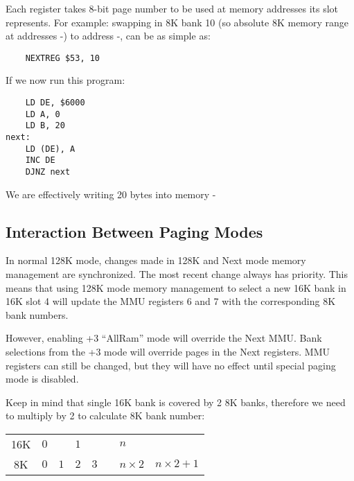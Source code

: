 \documentclass[12pt,twoside,openright,a4paper]{book}
\begin{document}
Each register takes 8-bit page number to be used at memory addresses its slot represents. For example: swapping in 8K bank 10 (so absolute 8K memory range at addresses -) to address -, can be as simple as:

\begin{lstlisting}
	NEXTREG $53, 10
\end{lstlisting}

If we now run this program:

\begin{lstlisting}
	LD DE, $6000
	LD A, 0
	LD B, 20
next:
	LD (DE), A
	INC DE
	DJNZ next
\end{lstlisting}

We are effectively writing 20 bytes into memory  - 

\pagebreak
\subsection{Interaction Between Paging Modes}

In normal 128K mode, changes made in 128K and Next mode memory management are synchronized. The most recent change always has priority. This means that using 128K mode memory management to select a new 16K bank in 16K slot 4 will update the MMU registers 6 and 7 with the corresponding 8K bank numbers.

However, enabling +3 ``AllRam'' mode will override the Next MMU. Bank selections from the +3 mode will override pages in the Next registers. MMU registers can still be changed, but they will have no effect until special paging mode is disabled.

Keep in mind that single 16K bank is covered by 2 8K banks, therefore we need to multiply by 2 to calculate 8K bank number:

{
	\def\arraystretch{1.5}
	\newcommand{\BankSize}[1]{#1}
	\newcommand{\BankNumber}[1]{#1}
	\begin{tabular}{|c|p{1cm}|p{1cm}|p{1cm}|p{1cm}|c|l|l|}
		\hline
		\BankSize{16K} & 
			\multicolumn{2}{l|}{\BankNumber{$0$}} & 
			\multicolumn{2}{l|}{\BankNumber{$1$}} & 
			\multirow{2}{*}{\ddd} & 
			\multicolumn{2}{l|}{\BankNumber{$n$}} \\
		\cline{1-5}
		\cline{7-8}
		\BankSize{8K} &
			\BankNumber{$0$} & 
			\BankNumber{$1$} & 
			\BankNumber{$2$} & 
			\BankNumber{$3$} &
			& 
			\BankNumber{$n \times 2$}  & 
			\BankNumber{$n \times 2 + 1$} \\
		\hline
	\end{tabular}
}
\end{document}
